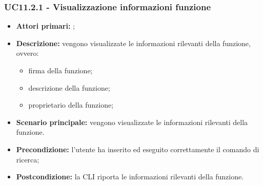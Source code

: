 \subsubsection{UC11.2.1 - Visualizzazione informazioni funzione }
\begin{itemize}
	\item \textbf{Attori primari:} \ua{};
	\item \textbf{Descrizione:} vengono visualizzate le informazioni rilevanti della funzione, ovvero:
	\begin{itemize}
		\item firma della funzione;
		\item descrizione della funzione;
		\item proprietario della funzione;
	\end{itemize}
	\item \textbf{Scenario principale:} vengono visualizzate le informazioni rilevanti della funzione. 
	\item \textbf{Precondizione:} l’utente ha inserito ed eseguito correttamente il comando di ricerca;  
	\item \textbf{Postcondizione:} la CLI riporta le informazioni rilevanti della funzione.
\end{itemize}